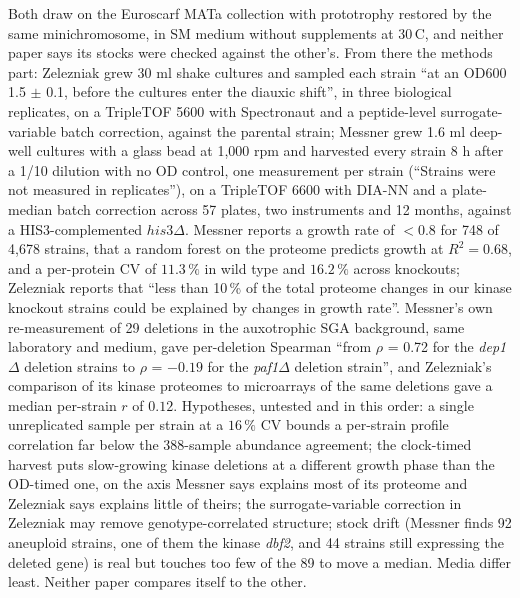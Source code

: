  Both draw on the Euroscarf MATa
collection with prototrophy restored by the same minichromosome, in SM medium without
supplements at 30\,\textdegree C, and neither paper says its stocks were checked against
the other's. From there the methods part: Zelezniak grew 30 ml shake cultures and
sampled each strain ``at an OD600 1.5 $\pm$ 0.1, before the cultures enter the diauxic
shift'', in three biological replicates, on a TripleTOF 5600 with Spectronaut and a
peptide-level surrogate-variable batch correction, against the parental strain; Messner
grew 1.6 ml deep-well cultures with a glass bead at 1,000 rpm and harvested every strain
8 h after a 1/10 dilution with no OD control, one measurement per strain
(``Strains were not measured in replicates''), on a TripleTOF 6600 with DIA-NN and a
plate-median batch correction across 57 plates, two instruments and 12 months, against
a HIS3-complemented $his3\Delta$. Messner reports a growth rate of $< 0.8$ for 748 of
4{,}678 strains, that a random forest on the proteome predicts growth at
$R^2 = 0.68$, and a per-protein CV of $11.3\,\%$ in wild type and $16.2\,\%$ across
knockouts; Zelezniak reports that ``less than 10\,\% of the total proteome changes in our
kinase knockout strains could be explained by changes in growth rate''. Messner's own
re-measurement of 29 deletions in the auxotrophic SGA background, same laboratory and
medium, gave per-deletion Spearman ``from $\rho$ = 0.72 for the \textit{dep1}$\Delta$
deletion strains to $\rho$ = $-0.19$ for the \textit{paf1}$\Delta$ deletion strain'', and
Zelezniak's comparison of its kinase proteomes to microarrays of the same deletions gave
a median per-strain $r$ of $0.12$. Hypotheses, untested and in this order: a single
unreplicated sample per strain at a $16\,\%$ CV bounds a per-strain profile correlation
far below the 388-sample abundance agreement; the clock-timed harvest puts slow-growing
kinase deletions at a different growth phase than the OD-timed one, on the axis Messner
says explains most of its proteome and Zelezniak says explains little of theirs; the
surrogate-variable correction in Zelezniak may remove genotype-correlated structure;
stock drift (Messner finds 92 aneuploid strains, one of them the kinase \textit{dbf2},
and 44 strains still expressing the deleted gene) is real but touches too few of the 89
to move a median. Media differ least. Neither paper compares itself to the other.

